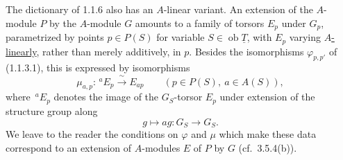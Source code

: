 The dictionary of 1.1.6 also has an $A$-linear variant. An extension
of the $A$-module $P$ by the $A$-module $G$ amounts to a family of
torsors $E_p$ under $G_p$, parametrized by points $p\in P(S)$ for
variable $S\in\operatorname{ob}\underline T$, with $E_p$ varying
\underline{$A$-linearly}, rather than merely additively, in $p$.
Besides the isomorphisms $\varphi_{p,p'}$ of (1.1.3.1), this is
expressed by isomorphisms
\[
 \mu_{a,p}:\,{}^{a}E_p\xrightarrow{\ \sim\ }E_{ap}
 \qquad(p\in P(S),\ a\in A(S)),
\]
where $\,{}^{a}E_p$ denotes the image of the $G_S$-torsor $E_p$ under
extension of the structure group along
\[
 g\longmapsto ag:G_S\longrightarrow G_S.
\]
We leave to the reader the conditions on $\varphi$ and $\mu$ which
make these data correspond to an extension of $A$-modules $E$ of $P$
by $G$ (cf.\ 3.5.4(b)).

